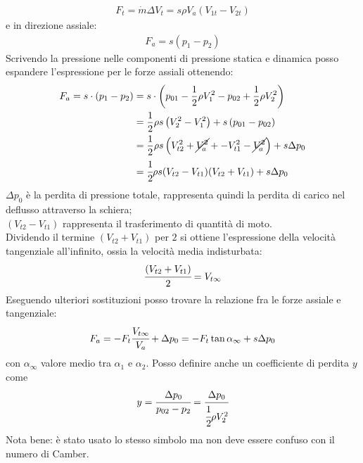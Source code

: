 \begin{align*}
F_t= \dot{m} \Delta V_t = s \rho	V_a (V_{1t}-V_{2t})
\end{align*}
e in direzione assiale:
\begin{align*}
F_a = s (p_1 - p_2)
\end{align*}
Scrivendo la pressione nelle componenti di pressione statica e dinamica posso espandere l'espressione per le forze assiali ottenendo:
\begin{align*}
F_a = s \cdot ( p_1 - p_2) &= s \cdot \left( p_{01} - \frac{1}{2} \rho V_1^2 - p_{02} + \frac{1}{2} \rho V_2^2 \right)\\
&= \frac{1}{2} \rho s \left( V_2^2 - V_1^2 \right) + s \left( p_{01} - p_{02} \right)\\
&= \frac{1}{2} \rho s \left( V_{t2}^2 + \cancel{V_a^2} + - V_{t1}^2- \cancel{V_a^2} \right) + s \Delta p_0\\
&=\cfrac{1}{2} \rho s (V_{t2}-V_{t1}) (V_{t2}+V_{t1}) + s \Delta p_0
\end{align*}
$\Delta p_0$ è la perdita di pressione totale, rappresenta quindi la perdita di carico nel deflusso attraverso la schiera; \\
$(V_{t2}-V_{t1})$ rappresenta il trasferimento di quantità di moto. \\
Dividendo il termine $(V_{t2}+V_{t1})$ per $2$ si ottiene l'espressione della velocità tangenziale all'infinito, ossia la velocità media indisturbata:
\begin{align*}
\cfrac{(V_{t2}+V_{t1})}{2} = V_{t \infty}
\end{align*}
Eseguendo ulteriori sostituzioni posso trovare la relazione fra le forze assiale e tangenziale:
\begin{align*}
F_a = -F_t \cfrac{V_{t \infty}}{V_a} + \Delta p_0 = - F_t \tan \alpha_{\infty} + s \Delta p_0
\end{align*}
con $\alpha_{\infty}$ valore medio tra $\alpha_1$ e $\alpha_2$. Posso definire anche un coefficiente di perdita $y$ come
\begin{align*}
y = \cfrac{\Delta p_0}{p_{02}-p_2} = \cfrac{\Delta p_0}{\cfrac{1}{2} \rho V_2^2}
\end{align*}
Nota bene: è stato usato lo stesso simbolo ma non deve essere confuso con il numero di Camber.

